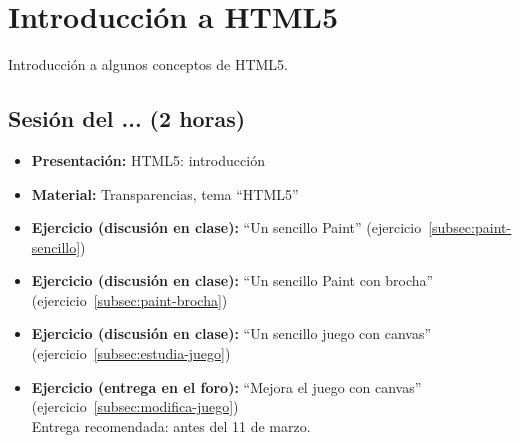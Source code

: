 \documentclass[a4paper,12pt]{report}
\begin{document}
\section{Introducción a HTML5}

Introducción a algunos conceptos de HTML5.

\subsection{Sesión del ... (2 horas)}

\begin{itemize}
 \item \textbf{Presentación:} HTML5: introducción
 \item \textbf{Material:} Transparencias, tema ``HTML5''


 \item \textbf{Ejercicio (discusión en clase):} ``Un sencillo Paint'' (ejercicio~\ref{subsec:paint-sencillo})
 \item \textbf{Ejercicio (discusión en clase):} ``Un sencillo Paint con brocha'' (ejercicio~\ref{subsec:paint-brocha}) \\
 \item \textbf{Ejercicio (discusión en clase):} ``Un sencillo juego con canvas'' (ejercicio~\ref{subsec:estudia-juego})
 \item \textbf{Ejercicio (entrega en el foro):} ``Mejora el juego con canvas'' (ejercicio~\ref{subsec:modifica-juego}) \\
Entrega recomendada: antes del 11 de marzo.
\end{itemize}
\end{document}
